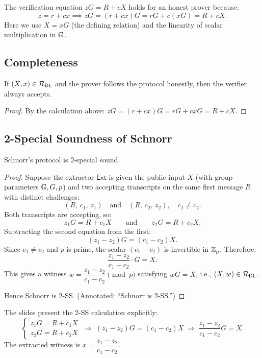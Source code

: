 \documentclass[11pt]{article}
\begin{document}
The verification equation $zG = R + cX$ holds for an honest prover because:
\[
  z = r + cx
  \implies
  zG = (r + cx)G = rG + c(xG) = R + cX.
\]
Here we use $X = xG$ (the defining relation) and the linearity of scalar multiplication in $\mathbb{G}$.

\subsection{Completeness}

\begin{proposition}
If $(X, x) \in \mathcal{R}_{\mathsf{DL}}$ and the prover follows the protocol honestly, then the verifier always accepts.
\end{proposition}

\begin{proof}
By the calculation above: $zG = (r + cx)G = rG + cxG = R + cX$.
\end{proof}

\subsection{2-Special Soundness of Schnorr}

\begin{theorem}
Schnorr's protocol is 2-special sound.
\end{theorem}

\begin{proof}
Suppose the extractor $\mathsf{Ext}$ is given the public input $X$ (with group parameters $\mathbb{G}, G, p$) and two accepting transcripts on the same first message $R$ with distinct challenges:
\[
  (R,\, c_1,\, z_1) \quad \text{and} \quad (R,\, c_2,\, z_2), \quad c_1 \neq c_2.
\]
Both transcripts are accepting, so:
\[
  z_1 G = R + c_1 X \qquad \text{and} \qquad z_2 G = R + c_2 X.
\]
Subtracting the second equation from the first:
\[
  (z_1 - z_2)G = (c_1 - c_2)X.
\]
Since $c_1 \neq c_2$ and $p$ is prime, the scalar $(c_1 - c_2)$ is invertible in $\mathbb{Z}_p$. Therefore:
\[
  \frac{z_1 - z_2}{c_1 - c_2} \cdot G = X.
\]
This gives a witness $w = \dfrac{z_1 - z_2}{c_1 - c_2} \pmod{p}$ satisfying $wG = X$, i.e., $(X, w) \in \mathcal{R}_{\mathsf{DL}}$.

Hence Schnorr is 2-SS. \qquad (Annotated: ``Schnorr is 2-SS.'')
\end{proof}

\begin{remark}
The slides present the 2-SS calculation explicitly:
\[
  \begin{cases} z_1 G = R + c_1 X \\ z_2 G = R + c_2 X \end{cases}
  \;\Rightarrow\;
  (z_1 - z_2)G = (c_1 - c_2)X
  \;\Rightarrow\;
  \frac{z_1 - z_2}{c_1 - c_2} G = X.
\]
The extracted witness is $x = \dfrac{z_1 - z_2}{c_1 - c_2}$.
\end{remark}
\end{document}
